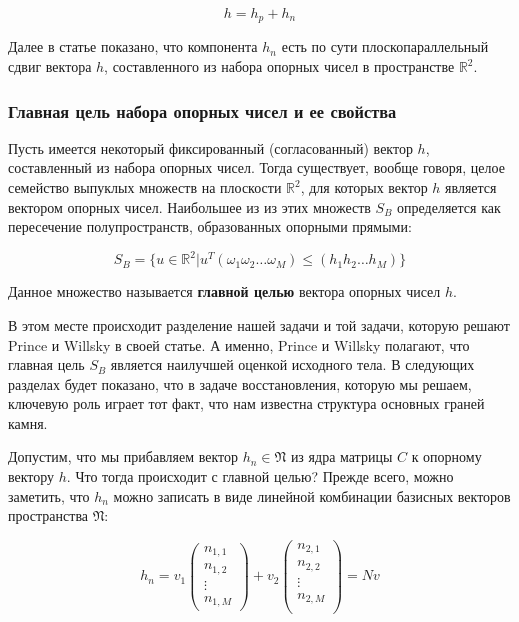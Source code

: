 \documentclass[a4paper,12pt, titlepage]{article}
\begin{document}
$$h = h_{p} + h_{n}$$

Далее в статье показано, что компонента $h_{n}$ есть по сути плоскопараллельный
сдвиг вектора $h$, составленного из набора опорных чисел в пространстве
$\mathbb{R}^{2}$.

\subsubsection{Главная цель набора опорных чисел и ее свойства}

Пусть имеется некоторый фиксированный (согласованный) вектор $h$, составленный
из набора опорных чисел. Тогда существует, вообще говоря, целое семейство
выпуклых множеств на плоскости $\mathbb{R}^{2}$, для которых вектор $h$ является
вектором опорных чисел. Наибольшее из из этих множеств $S_{B}$ определяется как
пересечение полупространств, образованных опорными прямыми:

$$
S_{B} = \{u \in \mathbb{R}^{2} |
u^{T} (\omega_{1} \omega_{2} \ldots \omega_{M}) \leq
(h_{1} h_{2} \ldots h_{M})\}
$$

Данное множество называется \textbf{главной целью} вектора опорных чисел $h$.

В этом месте происходит разделение нашей задачи и той задачи, которую решают
Prince и Willsky в своей статье. А именно, Prince и Willsky полагают, что
главная цель $S_{B}$ является наилучшей оценкой исходного тела. В следующих
разделах будет показано, что в задаче восстановления, которую мы решаем,
ключевую роль играет тот факт, что нам известна структура основных граней камня.

Допустим, что мы прибавляем вектор $h_{n} \in \mathfrak{N}$ из ядра матрицы $C$
к опорному вектору $h$. Что тогда происходит с главной целью? Прежде всего,
можно заметить, что $h_{n}$ можно записать в виде линейной комбинации базисных
векторов пространства $\mathfrak{N}$:

$$
h_{n} = v_{1} \left(
  \begin{array}{c}
   n_{1, 1} \\
   n_{1, 2} \\
   \vdots \\
   n_{1, M}
  \end{array}
  \right) + v_{2} \left(
  \begin{array}{c}
   n_{2, 1} \\
   n_{2, 2} \\
   \vdots \\
   n_{2, M} \\
  \end{array}
  \right) = N v
$$
\end{document}
